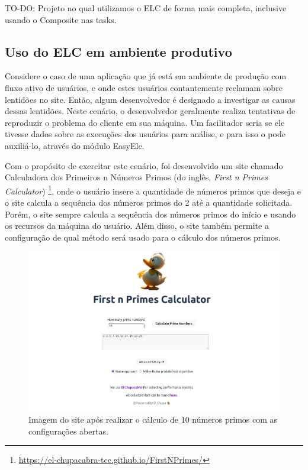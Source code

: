 \documentclass[12pt]{tcc}
\begin{document}
TO-DO: Projeto no qual utilizamos o ELC de forma mais completa, inclusive usando o Composite nas tasks.


\subsection{Uso do ELC em ambiente produtivo}

Considere o caso de uma aplicação que já está em ambiente de produção com fluxo ativo de usuários, e onde estes usuários contantemente reclamam sobre lentidões no site.
Então, algum desenvolvedor é designado a investigar as causas dessas lentidões.
Neste cenário, o desenvolvedor geralmente realiza tentativas de reproduzir o problema do cliente em sua máquina. Um facilitador seria se ele tivesse dados sobre as execuções dos usuários para análise, e para isso o  pode auxiliá-lo, através do módulo EasyElc.


Com o propósito de exercitar este cenário, foi desenvolvido um site chamado Calculadora dos Primeiros n Números Primos (do inglês, \emph{First n Primes Calculator})
\footnote{\url{https://el-chupacabra-tcc.github.io/FirstNPrimes/}}, onde o usuário insere a quantidade de números primos que deseja e o site calcula a sequência dos números primos do 2 até a quantidade solicitada.
Porém, o site sempre calcula a sequência dos números primos do início e usando os recursos da máquina do usuário.
Além disso, o site também permite a configuração de qual método será usado para o cálculo dos números primos.

\begin{figure}[!ht]
	\centering
	\includegraphics[width=1\textwidth]{figures/print-elc-numeros-primos.jpeg}
	\caption{Imagem do site após realizar o cálculo de 10 números primos com as configurações abertas.}
	\label{fig:site-numeros-primos}
\end{figure}
\end{document}
